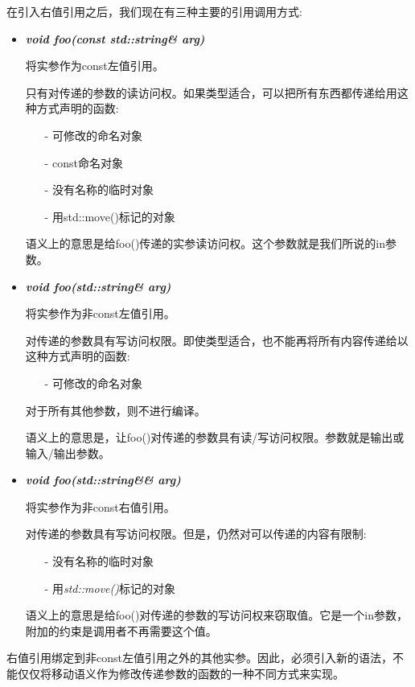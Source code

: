 在引入右值引用之后，我们现在有三种主要的引用调用方式:\par

\begin{itemize}
	\item \textit{\textbf{void foo(const std::string\& arg)}}\par
	将实参作为const左值引用。\par
	只有对传递的参数的读访问权。如果类型适合，可以把所有东西都传递给用这种方式声明的函数:\par
	\begin{itemize}
		\item[-] 可修改的命名对象
		\item[-] const命名对象
		\item[-] 没有名称的临时对象
		\item[-] 用std::move()标记的对象
	\end{itemize}
	语义上的意思是给foo()传递的实参读访问权。这个参数就是我们所说的in参数。
	\item \textit{\textbf{void foo(std::string\& arg)}}\par
	将实参作为非const左值引用。\par
	对传递的参数具有写访问权限。即使类型适合，也不能再将所有内容传递给以这种方式声明的函数:\par
	\begin{itemize}
		\item[-] 可修改的命名对象
	\end{itemize}
	对于所有其他参数，则不进行编译。\par
	语义上的意思是，让foo()对传递的参数具有读/写访问权限。参数就是输出或输入/输出参数。\par
	\item \textit{\textbf{void foo(std::string\&\& arg)}}\par
	将实参作为非const右值引用。\par
	对传递的参数具有写访问权限。但是，仍然对可以传递的内容有限制:\par
	\begin{itemize}
		\item[-] 没有名称的临时对象
		\item[-] 用\textit{std::move()}标记的对象
	\end{itemize}
	语义上的意思是给foo()对传递的参数的写访问权来窃取值。它是一个in参数，附加的约束是调用者不再需要这个值。
\end{itemize}

右值引用绑定到非const左值引用之外的其他实参。因此，必须引入新的语法，不能仅仅将移动语义作为修改传递参数的函数的一种不同方式来实现。\par

